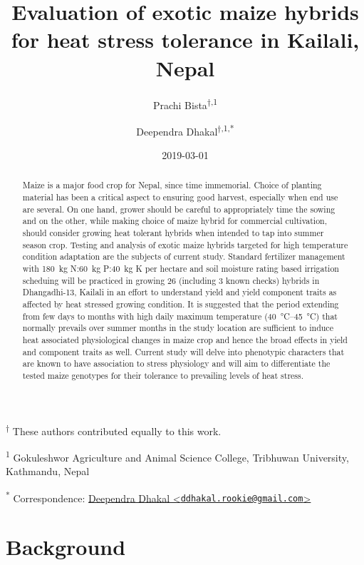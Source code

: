 \documentclass[
]{article}
\title{Evaluation of exotic maize hybrids for heat stress tolerance in Kailali, Nepal}
\author{Prachi Bista\textsuperscript{$\dagger{}$,1} \and Deependra Dhakal\textsuperscript{$\dagger{}$,1,*}}
\date{2019-03-01}
\begin{document}
\maketitle
\begin{abstract}
Maize is a major food crop for Nepal, since time immemorial. Choice of planting material has been a critical aspect to ensuring good harvest, especially when end use are several. On one hand, grower should be careful to appropriately time the sowing and on the other, while making choice of maize hybrid for commercial cultivation, should consider growing heat tolerant hybrids when intended to tap into summer season crop. Testing and analysis of exotic maize hybrids targeted for high temperature condition adaptation are the subjects of current study. Standard fertilizer management with \SI{180}{\kg} N:\SI{60}{\kg} P:\SI{40}{\kg} K per hectare and soil moisture rating based irrigation scheduing will be practiced in growing 26 (including 3 known checks) hybrids in Dhangadhi-13, Kailali in an effort to understand yield and yield component traits as affected by heat stressed growing condition. It is suggested that the period extending from few days to months with high daily maximum temperature (\SIrange{40}{45}{\celsius}) that normally prevails over summer months in the study location are sufficient to induce heat associated physiological changes in maize crop and hence the broad effects in yield and component traits as well. Current study will delve into phenotypic characters that are known to have association to stress physiology and will aim to differentiate the tested maize genotypes for their tolerance to prevailing levels of heat stress.
\end{abstract}

\textsuperscript{$\dagger{}$} These authors contributed equally to this work.

\textsuperscript{1} Gokuleshwor Agriculture and Animal Science College, Tribhuwan University, Kathmandu, Nepal

\textsuperscript{*} Correspondence: \href{mailto:ddhakal.rookie@gmail.com}{Deependra Dhakal \textless{}\href{mailto:ddhakal.rookie@gmail.com}{\nolinkurl{ddhakal.rookie@gmail.com}}\textgreater{}}

\newpage

\hypertarget{background}{%
\section{Background}\label{background}}
\end{document}
